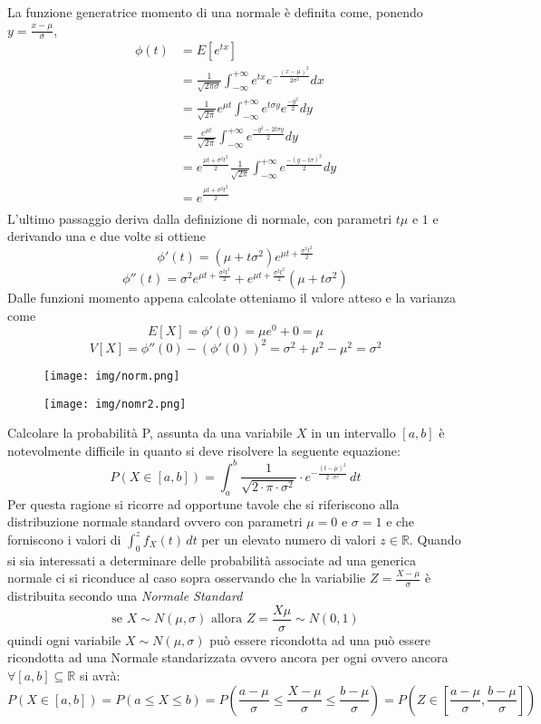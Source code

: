 \documentclass[a4paper,12pt, oneside]{book}
\newcommand{\numberset}{\mathbb}
\newcommand{\R}{\numberset{R}}
\begin{document}
La funzione generatrice momento di una normale è definita come, ponendo $y = \frac{x - \mu}{\sigma}$,
\[ \begin{split}
    \phi(t) & = E[e^{tx}] \\
            & = \frac{1}{\sqrt{2 \pi \sigma}} \int _{-\infty}^{+\infty} e^{tx} e^{-\frac{(x - \mu)^2}{2\sigma^2}} dx \\
            & = \frac{1}{\sqrt{2 \pi}} e^{\mu t} \int _{-\infty}^{+\infty} e^{t \sigma y} e^{\frac{-y^2}{2}} dy \\ 
            & = \frac{e^{\mu t}}{\sqrt{2 \pi}} \int _{-\infty}^{+\infty} e^{\frac{-y^2 - 2t \sigma y}{2}} dy \\
            & = e^{\frac{\mu t + \sigma^2 t^2}{2}} \frac{1}{\sqrt{2\pi}} \int _{-\infty}^{+\infty} e^{\frac{-(y -t\sigma)^2}{2}} dy\\
            & = e^{\frac{\mu t + \sigma^2 t^2}{2}}\\
    \end{split} \]
L'ultimo passaggio deriva dalla definizione di normale, con parametri $t\mu$ e $1$ 
e derivando una e due volte si ottiene 
\[ \phi'(t) = (\mu + t\sigma^2) e^{\mu t + \frac{\sigma^2t^2}{2}} \]
\[ \phi''(t) = \sigma^2 e^{\mu t + \frac{\sigma^2 t^2}{2}} + e^{\mu t + \frac{\sigma^2 t^2}{2}} (\mu + t\sigma^2) \]
Dalle funzioni momento appena calcolate otteniamo il valore atteso e la varianza come
\[E[X] = \phi'(0) = \mu e^0 + 0 = \mu \]
\[V[X] = \phi''(0) - (\phi'(0))^2 = \sigma^2 + \mu^2 - \mu^2 = \sigma^2 \]

\begin{figure}
    \texttt{[image: img/norm.png]}
\end{figure}
\begin{figure}
    \texttt{[image: img/nomr2.png]}
\end{figure}
Calcolare la probabilità P, assunta da una variabile $X$ in un intervallo $[a, b]$ è notevolmente difficile in
quanto si deve risolvere la seguente equazione:
\[P(X \in [a,b]) = \int_a^b \frac{1}{\sqrt{2\cdot \pi\cdot \sigma^2}}\cdot e^{-\frac{(t-\mu)^2}{2\cdot \sigma^2}}\,dt\]
Per questa ragione si ricorre ad opportune tavole che si riferiscono alla distribuzione normale standard 
ovvero con parametri $\mu = 0$ e $\sigma = 1$ e che forniscono i valori di $\int_0^z f_X(t)\,dt$ 
per un elevato numero di valori $z \in \R$.\newline
Quando si sia interessati a determinare delle probabilità associate ad una generica normale ci si riconduce al
caso sopra osservando che la variabilie $Z = \frac{X - \mu}{\sigma}$ è distribuita secondo una \emph{Normale Standard}
\[\mbox{se } X \sim N(\mu, \sigma) \mbox{ allora } Z = \frac{X \mu}{\sigma} \sim N(0,1)\]
quindi ogni variabile $X \sim N(\mu, \sigma)$ può essere ricondotta ad una può essere ricondotta ad una Normale
standarizzata ovvero ancora per ogni ovvero ancora $\forall [a,b] \subseteq \R$ si avrà:
\[P(X \in [a,b]) = P(a \leq X \leq b) =P \left(\frac{a - \mu}{\sigma} \leq \frac{X-\mu}{\sigma} \leq 
                   \frac{b-\mu}{\sigma}\right) = P \left(Z \in \left[\frac{a-\mu}{\sigma},\frac{b-\mu}{\sigma}\right]\right)\]
\end{document}
